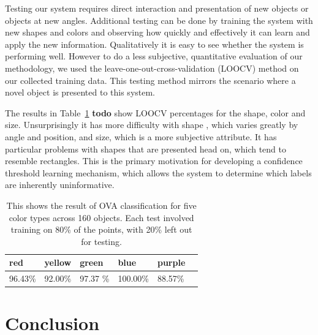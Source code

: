 \documentclass[11pt]{article}
\newcommand{\xxx}[1]{{\bf \color{red} #1}}
\newcommand\T{\rule{0pt}{3ex}}
\newcommand\B{\rule[-1.2ex]{0pt}{0pt}}
\begin{document}
Testing our system requires direct interaction and presentation of new objects 
or objects at new angles.  Additional testing can be done by training the 
system with new shapes and colors and observing how quickly and effectively it 
can learn and apply the new information.  Qualitatively it is easy to see 
whether the system is performing well.  However to do a less subjective, 
quantitative evaluation of our methodology, we used the leave-one-out-cross-validation 
(LOOCV) method on our collected training data.  This testing method mirrors the 
scenario where a novel object is presented to this system.

The results in Table~\ref{tbl:testresults} \xxx{todo} show LOOCV percentages 
for the shape, color and size.  Unsurprisingly it has more difficulty with shape
, which varies greatly by angle and position, and size, which is a more 
subjective attribute. It has particular problems with shapes that are presented 
head on, which tend to resemble rectangles.  This is the primary motivation for 
developing a confidence threshold learning mechanism, which allows the system 
to determine which labels are inherently uninformative.


\begin{table}
\centering
\begin{tabular}{ | l | l | l | l | l | l |}
    \hline
    red &  yellow & green & blue & purple \T \B \\ \hline
    96.43\%  & 92.00\% & 97.37 \% & 100.00\% & 88.57\% \B \T \\ \hline
\end{tabular}
\caption{This shows the result of OVA classification for five color types
    across 160 objects. Each test involved training on 80\% of the points,
           with 20\% left out for testing.}
\label{tbl:testresults}
\end{table}


\section{Conclusion}




\end{document}
